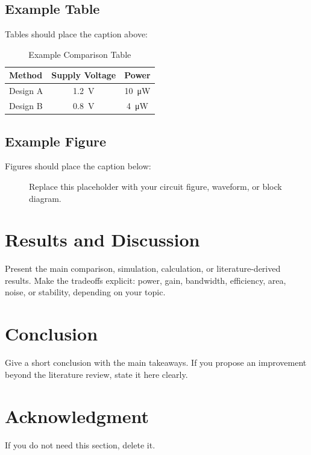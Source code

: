 \documentclass[conference,a4paper]{IEEEtran}
\begin{document}
\subsection{Example Table}
Tables should place the caption above:
\begin{table}[!t]
  \caption{Example Comparison Table}
  \label{tab:example}
  \centering
  \begin{tabular}{lcc}
    \toprule
    Method & Supply Voltage & Power \\
    \midrule
    Design A & \SI{1.2}{\volt} & \SI{10}{\micro\watt} \\
    Design B & \SI{0.8}{\volt} & \SI{4}{\micro\watt} \\
    \bottomrule
  \end{tabular}
\end{table}

\subsection{Example Figure}
Figures should place the caption below:
\begin{figure}[!t]
  \centering
  \fbox{\rule{0pt}{1.2in}\rule{0.9\columnwidth}{0pt}}
  \caption{Replace this placeholder with your circuit figure, waveform, or block diagram.}
  \label{fig:placeholder}
\end{figure}

\section{Results and Discussion}
Present the main comparison, simulation, calculation, or literature-derived results.
Make the tradeoffs explicit: power, gain, bandwidth, efficiency, area, noise, or stability, depending on your topic.

\section{Conclusion}
Give a short conclusion with the main takeaways.
If you propose an improvement beyond the literature review, state it here clearly.

\section*{Acknowledgment}
If you do not need this section, delete it.

\balance


\end{document}
